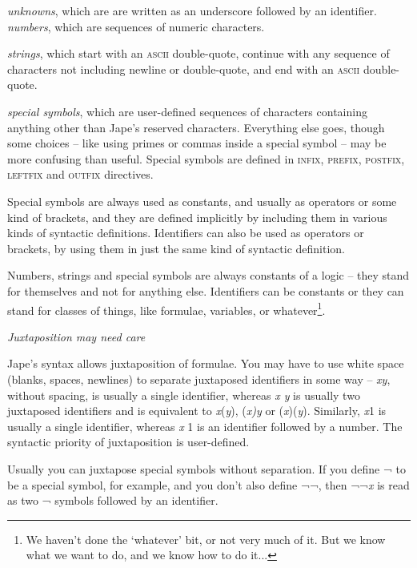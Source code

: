 \documentclass[11pt]{book}
\newcommand{\tab}{\hspace{5mm}}
\begin{document}
{\textbullet}\tab \textit{unknowns}, which are are written as an underscore followed by an identifier.\\
{\textbullet}\tab \textit{numbers}, which are sequences of numeric characters.


{\textbullet}\tab \textit{strings}, which start with an \textsc{ascii} double-quote, continue with any sequence of characters not including newline or double-quote, and end with an \textsc{ascii} double-quote.


{\textbullet}\tab \textit{special symbols}, which are user-defined sequences of characters containing anything other than Jape's reserved characters. Everything else goes, though some choices -- like using primes or commas inside a special symbol -- may be more confusing than useful. Special symbols are defined in \textsc{infix, prefix, postfix, leftfix} and \textsc{outfix} directives.


Special symbols are always used as constants, and usually as operators or some kind of brackets, and they are defined implicitly by including them in various kinds of syntactic definitions. Identifiers can also be used as operators or brackets, by using them in just the same kind of syntactic definition.


Numbers, strings and special symbols are always constants of a logic -- they stand for themselves and not for anything else. Identifiers can be constants or they can stand for classes of things, like formulae, variables, or whatever\footnote{We haven't done the `whatever' bit, or not very much of it. But we know what we want to do, and we know how to do it...}.


\textit{Juxtaposition may need care}


Jape's syntax allows juxtaposition of formulae. You may have to use white space (blanks, spaces, newlines) to separate juxtaposed identifiers in some way -- \textit{xy}, without spacing, is usually a single identifier, whereas \textit{x y} is usually two juxtaposed identifiers and is equivalent to \textit{x}(\textit{y}), (\textit{x)y} or (\textit{x})(\textit{y}). Similarly, \textit{x}1 is usually a single identifier, whereas \textit{x} 1 is an identifier followed by a number. The syntactic priority of juxtaposition is user-defined.


Usually you can juxtapose special symbols without separation. If you define ¬ to be a special symbol, for example, and you don't also define ¬¬, then ¬¬\textit{x} is read as two ¬ symbols followed by an identifier.
\end{document}
